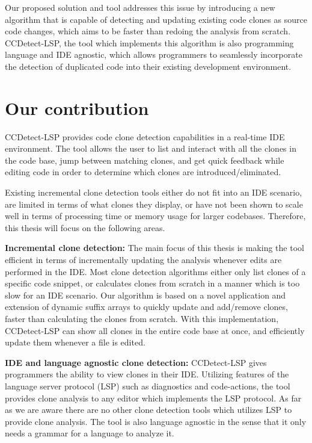 Our proposed solution and tool addresses this issue by introducing a new algorithm that is
capable of detecting and updating existing code clones as source code changes, which aims
to be faster than redoing the analysis from scratch. CCDetect-LSP, the tool which
implements this algorithm is also programming language and IDE agnostic, which allows
programmers to seamlessly incorporate the detection of duplicated code into their existing
development environment.

\section{Our contribution}

CCDetect-LSP provides code clone detection capabilities in a real-time IDE environment.
The tool allows the user to list and interact with all the clones in the code base, jump
between matching clones, and get quick feedback while editing code in order to determine
which clones are introduced/eliminated.

Existing incremental clone detection tools either do not fit into an IDE scenario, are
limited in terms of what clones they display, or have not been shown to scale well in
terms of processing time or memory usage for larger codebases. Therefore, this thesis will
focus on the following areas.

\textbf{Incremental clone detection:} The main focus of this thesis is making the tool
efficient in terms of incrementally updating the analysis whenever edits are performed in
the IDE. Most clone detection algorithms either only list clones of a specific code
snippet, or calculates clones from scratch in a manner which is too slow for an IDE
scenario. Our algorithm is based on a novel application and extension of dynamic suffix
arrays to quickly update and add/remove clones, faster than calculating the clones from
scratch. With this implementation, CCDetect-LSP can show all clones in the entire code
base at once, and efficiently update them whenever a file is edited.

\textbf{IDE and language agnostic clone detection:} CCDetect-LSP gives programmers the
ability to view clones in their IDE. Utilizing features of the language server protocol
(LSP) such as diagnostics and code-actions, the tool provides clone analysis to any editor
which implements the LSP protocol. As far as we are aware there are no other clone
detection tools which utilizes LSP to provide clone analysis. The tool is also language
agnostic in the sense that it only needs a grammar for a language to analyze it.

